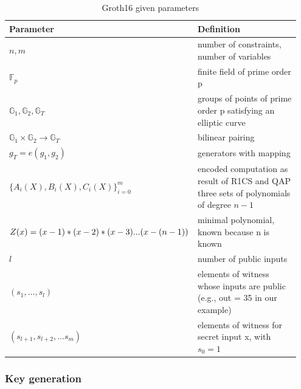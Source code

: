 \begin{table}[ht]
	\centering
	    \caption{Groth16 given parameters}
		\begin{tabular}{| m{0.35\linewidth} | m{0.6\linewidth} |}
		\hline
		\textbf{Parameter} & \textbf{Definition}\\ \hline
            \(n,m\) & number of constraints, number of variables\\ \hline
            \begin{math}\mathbb{F}_p\end{math} & finite field of prime order p\\ \hline 
            \begin{math}\mathbb{G}_1, \mathbb{G}_2, \mathbb{G}_T\end{math} & groups of points of prime order p satisfying an elliptic curve\\ \hline
            \begin{math}\mathbb{G}_1 \times \mathbb{G}_2 \to \mathbb{G}_T\end{math}& bilinear pairing \\ \hline
            \begin{math}g_T = e(g_1, g_2)\end{math}& generators with mapping \\\hline
            \begin{math}\bigl\{A_i(X), B_i(X), C_i(X)\bigl\}_{i=0}^m\end{math} & encoded computation as result of R1CS and QAP three sets of polynomials of degree \(n-1\)\\ \hline
            \(Z(x) = (x-1)*(x-2) * \newline (x-3)...(x-(n-1))\) &  minimal polynomial, known because n is known \\ \hline
            \(l\) & number of public inputs \\ \hline
            \((s_1,...,s_l)\) & elements of witness whose inputs are public \newline (e.g., out = 35 in our example) \\ \hline
            \((s_{l+1},s_{l+2},...s_m)\) & elements of witness for secret input x, with \(s_0 = 1\) \\ \hline
	\end{tabular}
\label{tab:Groth16Params}
\end{table}

\subsubsection{Key generation}

